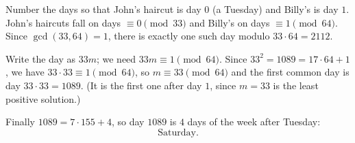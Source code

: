 Number the days so that John's haircut is day $0$ (a Tuesday) and Billy's is day $1$. John's haircuts fall on days $\equiv0\pmod{33}$ and Billy's on days $\equiv1\pmod{64}$. Since $\gcd(33,64)=1$, there is exactly one such day modulo $33\cdot64=2112$.

Write the day as $33m$; we need $33m\equiv1\pmod{64}$. Since $33^2=1089=17\cdot64+1$, we have $33\cdot33\equiv1\pmod{64}$, so $m\equiv33\pmod{64}$ and the first common day is day $33\cdot33=1089$. (It is the first one after day $1$, since $m=33$ is the least positive solution.)

Finally $1089=7\cdot155+4$, so day $1089$ is $4$ days of the week after Tuesday:
\[
\boxed{\text{Saturday}}.
\]
